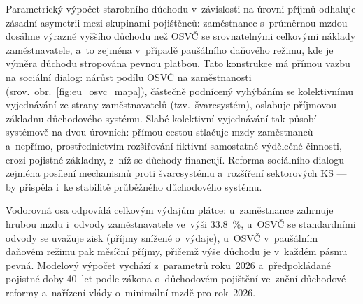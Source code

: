 Parametrický výpočet starobního důchodu v~závislosti na úrovni příjmů odhaluje zásadní asymetrii mezi skupinami pojištěnců: zaměstnanec s~průměrnou mzdou dosáhne výrazně vyššího důchodu než \ac{OSVČ} se srovnatelnými celkovými náklady zaměstnavatele, a~to zejména v~případě paušálního daňového režimu, kde je výměra důchodu stropována pevnou platbou.
Tato konstrukce má přímou vazbu na sociální dialog: nárůst podílu \ac{OSVČ} na zaměstnanosti (srov.~obr.~\ref{fig:eu_osvc_mapa}), částečně podnícený vyhýbáním se kolektivnímu vyjednávání ze strany zaměstnavatelů (tzv.\ švarcsystém), oslabuje příjmovou základnu důchodového systému.
Slabé kolektivní vyjednávání tak působí systémově na dvou úrovních: přímou cestou stlačuje mzdy zaměstnanců a~nepřímo, prostřednictvím rozšiřování fiktivní samostatné výdělečné činnosti, erozi pojistné základny, z~níž se důchody financují.
Reforma sociálního dialogu --- zejména posílení mechanismů proti švarcsystému a~rozšíření sektorových \ac{KS} --- by přispěla i~ke stabilitě průběžného důchodového systému.

Vodorovná osa odpovídá celkovým výdajům plátce: u~zaměstnance zahrnuje hrubou mzdu i~odvody zaměstnavatele ve~výši \SI{33,8}{\percent}, u~\acs{OSVČ} se standardními odvody se uvažuje zisk (příjmy snížené o~výdaje), u~\acs{OSVČ} v~paušálním daňovém režimu pak měsíční příjmy, přičemž výše důchodu je v~každém pásmu pevná. Modelový výpočet vychází z~parametrů roku~2026 a~předpokládané pojistné doby 40~let podle zákona o~důchodovém pojištění ve~znění důchodové reformy a~nařízení vlády o~minimální mzdě pro rok~2026.~\cite{zakon_zpds_1995}~\cite{zakon_duchreforma_2023}~\cite{nv_365_2025}\par


